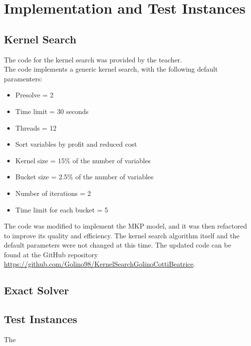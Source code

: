 \chapter{Implementation and Test Instances}

\section{Kernel Search}
The code for the kernel search was provided by the teacher.\\
The code implements a generic kernel search, with the following default paramenters:
\begin{itemize}
    \item Presolve = 2
    \item Time limit = 30 seconds
    \item Threads = 12
    \item Sort variables by profit and reduced cost
    \item Kernel size = 15\% of the number of variables
    \item Bucket size = 2.5\% of the number of variables
    \item Number of iterations = 2
    \item Time limit for each bucket = 5
\end{itemize}

The code was modified to implement the MKP model, and it was then
refactored to improve its quality and efficiency.
The kernel search algorithm itself and the default parameters were not changed
at this time.
The updated code can be found at the GitHub repository
\url{https://github.com/Golino98/KernelSearchGolinoCottiBeatrice}.

\section{Exact Solver}
\section{Test Instances}
The